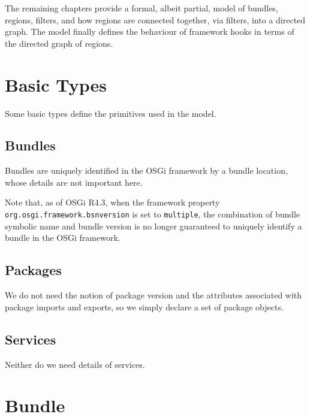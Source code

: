 \documentclass[a4paper,9pt]{article}
\begin{document}
The remaining chapters provide a formal, albeit partial, model of bundles, regions, filters, and how
regions are connected together, via filters, into a directed graph.
The model finally defines the behaviour of framework hooks in terms of the directed graph of regions.

\clearpage
\section{Basic Types}
\label{cha:basics}

Some basic types define the primitives used in the model.

\subsection*{Bundles}

Bundles are uniquely identified in the OSGi framework by a bundle location, whose details are not
important here.
\begin{zed}
  [BLoc]
\end{zed}
Note that, as of OSGi R4.3, when the framework property \texttt{org.osgi.framework.bsnversion}
is set to \texttt{multiple}, the combination of bundle symbolic name and bundle version is no
longer guaranteed to uniquely identify a bundle in the OSGi framework.

\subsection*{Packages}

We do not need the notion of package version and the attributes associated with package imports
and exports, so we simply declare a set of package objects.
\begin{zed}
  [Package]
\end{zed}

\subsection*{Services}

Neither do we need details of services.
\begin{zed}
  [Service]
\end{zed}

\clearpage
\section{Bundle}
\label{cha:bundle}
\end{document}
